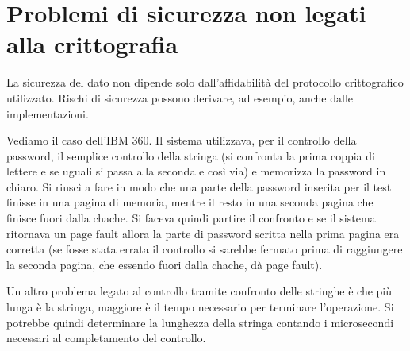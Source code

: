 \section{Problemi di sicurezza non legati alla crittografia}
La sicurezza del dato non dipende solo dall'affidabilità del protocollo crittografico utilizzato. Rischi di sicurezza possono derivare, ad esempio, anche dalle implementazioni. 

Vediamo il caso dell'IBM 360. Il sistema utilizzava, per il controllo della password, il semplice controllo della stringa (si confronta la prima coppia di lettere e se uguali si passa alla seconda e così via) e memorizza la password in chiaro. Si riuscì a fare in modo che una parte della password inserita per il test finisse in una pagina di memoria, mentre il resto in una seconda pagina che finisce fuori dalla chache. Si faceva quindi partire il confronto e se il sistema ritornava un page fault allora la parte di password scritta nella prima pagina era corretta (se fosse stata errata il controllo si sarebbe fermato prima di raggiungere la seconda pagina, che essendo fuori dalla chache, dà page fault).

Un altro problema legato al controllo tramite confronto delle stringhe è che più lunga è la stringa, maggiore è il tempo necessario per terminare l'operazione. Si potrebbe quindi determinare la lunghezza della stringa contando i microsecondi necessari al completamento del controllo.
